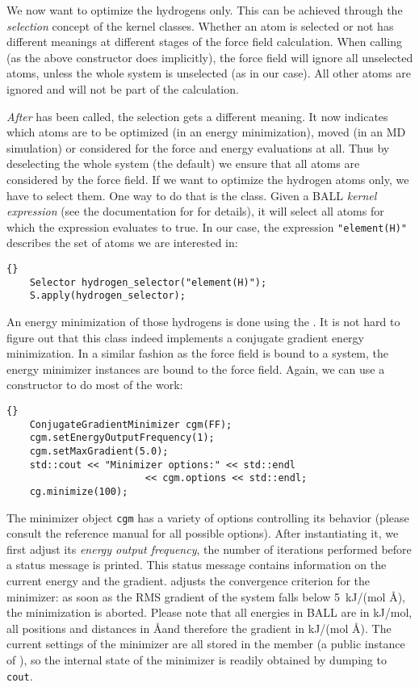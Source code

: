 We now want to optimize the hydrogens only. This can be achieved through the
{\em selection} concept of the kernel classes. Whether an atom is selected or
not has different meanings at different stages of the force field calculation.
When calling  (as the above constructor does implicitly),
the force field will ignore all unselected atoms, unless the whole system is
unselected (as in our case). All other atoms are ignored and will not be part
of the calculation.

{\em After}  has been called, the selection gets a different
meaning. It now indicates which atoms are to be optimized (in an energy
minimization), moved (in an MD simulation) or considered for the force and
energy evaluations at all. Thus by deselecting the whole system (the default)
we ensure that all atoms are considered by the force field. If we want to
optimize the hydrogen atoms only, we have to select them. One way to do that
is the  class. Given a BALL {\em kernel expression} (see the
documentation for  for details), it will select all atoms
for which the expression evaluates to true. In our case, the expression 
{\tt "element(H)"} describes the set of atoms we are interested in:

\begin{lstlisting}{}
	Selector hydrogen_selector("element(H)");
	S.apply(hydrogen_selector);
\end{lstlisting}

\noindent
An energy minimization of those hydrogens is done using the
. It is not hard to figure out that this
class indeed implements a conjugate gradient energy minimization.
In a similar fashion as the force field is bound to a system, the 
energy minimizer instances are bound to the force field. Again, we can use a
constructor to do most of the work:

\begin{lstlisting}{}
	ConjugateGradientMinimizer cgm(FF);
	cgm.setEnergyOutputFrequency(1);
	cgm.setMaxGradient(5.0);
	std::cout << "Minimizer options:" << std::endl 
						<< cgm.options << std::endl;
	cg.minimize(100);
\end{lstlisting}

\noindent
The minimizer object {\tt cgm} has a variety of options controlling its
behavior (please consult the reference manual for all possible options).
After instantiating it, we first adjust its {\em energy output frequency},
\ie the number of iterations performed before a status message is printed.
This status message contains information on the current energy and the
gradient.  adjusts the convergence criterion for the
minimizer: as soon as the RMS gradient of the system falls below 5~kJ/(mol
\AA), the minimization is aborted. Please note that all energies in BALL
are in kJ/mol, all positions and distances in \AA and therefore the gradient
in kJ/(mol \AA). The current settings of the minimizer are all stored in 
the member  (a public instance of 
), so the internal state of the minimizer is readily obtained by
dumping  to {\tt cout}.

